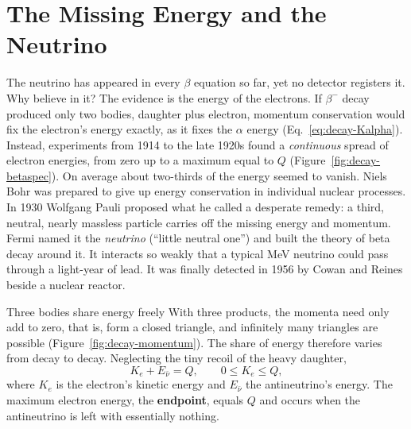 \section{The Missing Energy and the Neutrino}\label{sec:decay-neutrino}

The neutrino has appeared in every $\beta$ equation so far, yet no detector registers it. Why believe in
it? The evidence is the energy of the electrons. If $\beta^-$ decay produced only two bodies, daughter plus
electron, momentum conservation would fix the electron's energy exactly, as it fixes the $\alpha$ energy
(Eq.~\eqref{eq:decay-Kalpha}). Instead, experiments from 1914 to the late 1920s found a \emph{continuous}
spread of electron energies, from zero up to a maximum equal to $Q$ (Figure~\ref{fig:decay-betaspec}). On
average about two-thirds of the energy seemed to vanish. Niels Bohr was prepared to give up energy
conservation in individual nuclear processes. In 1930 Wolfgang Pauli proposed what he called a desperate
remedy: a third, neutral, nearly massless particle carries off the missing energy and momentum. Fermi named
it the \emph{neutrino} (``little neutral one'') and built the theory of beta decay around it. It interacts
so weakly that a typical MeV neutrino could pass through a light-year of lead. It was finally detected in
1956 by Cowan and Reines beside a nuclear reactor.

\begin{figure}[htbp]
\centering
{}
\end{figure}

\begin{keybox}{Three bodies share energy freely}
With three products, the momenta need only add to zero, that is, form a closed triangle, and infinitely
many triangles are possible (Figure~\ref{fig:decay-momentum}). The share of energy therefore varies from
decay to decay. Neglecting the tiny recoil of the heavy daughter,
\[
K_e+E_{\bar\nu}=Q,\qquad 0\le K_e\le Q,
\]
where $K_e$ is the electron's kinetic energy and $E_{\bar\nu}$ the antineutrino's energy. The maximum
electron energy, the \textbf{endpoint}, equals $Q$ and occurs when the antineutrino is left with
essentially nothing.
\end{keybox}

